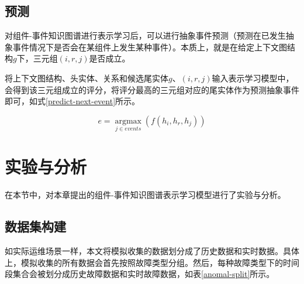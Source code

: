 \subsection{预测}
对组件-事件知识图谱进行表示学习后，可以进行抽象事件预测（预测在已发生抽象事件情况下是否会在某组件上发生某种事件）。本质上，就是在给定上下文图结构$g$下，三元组$(i, r, j)$是否成立。

将上下文图结构、头实体、关系和候选尾实体$g$、$(i, r, j)$输入表示学习模型中，会得到该三元组成立的评分，将评分最高的三元组对应的尾实体作为预测抽象事件即可，如式\ref{predict-next-event}所示。

\begin{equation}
    e = \mathop{\arg\max}\limits_{j\in events}( f (h_i, h_r, h_j)) 
    \label{predict-next-event}   
\end{equation}


\section{实验与分析}\label{representation-experiment}
在本节中，对本章提出的组件-事件知识图谱表示学习模型进行了实验与分析。
\subsection{数据集构建}
如实际运维场景一样，本文将模拟收集的数据划分成了历史数据和实时数据。具体上，模拟收集的所有数据会首先按照故障类型分组。然后，每种故障类型下的时间段集合会被划分成历史故障数据和实时故障数据，如表\ref{anomal-split}所示。

